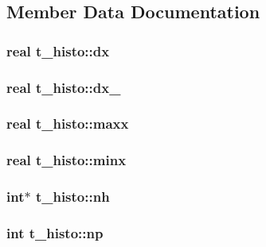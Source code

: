 \subsection{\-Member \-Data \-Documentation}
\hypertarget{structt__histo_a9edd12533230675c2ca282bf39e7ad4f}{
\subsubsection[{dx}]{\setlength{\rightskip}{0pt plus 5cm}real {\bf t\-\_\-histo\-::dx}}}\label{structt__histo_a9edd12533230675c2ca282bf39e7ad4f}
\hypertarget{structt__histo_ae3ce29279673f1d941fd5733d7936ae0}{
\subsubsection[{dx\-\_\-1}]{\setlength{\rightskip}{0pt plus 5cm}real {\bf t\-\_\-histo\-::dx\-\_}}}\label{structt__histo_ae3ce29279673f1d941fd5733d7936ae0}
\hypertarget{structt__histo_a8e6d60a954f1a7c126480e90e39b3ddd}{
\subsubsection[{maxx}]{\setlength{\rightskip}{0pt plus 5cm}real {\bf t\-\_\-histo\-::maxx}}}\label{structt__histo_a8e6d60a954f1a7c126480e90e39b3ddd}
\hypertarget{structt__histo_a169193dcbcd7e2c6149afabc2cb041e2}{
\subsubsection[{minx}]{\setlength{\rightskip}{0pt plus 5cm}real {\bf t\-\_\-histo\-::minx}}}\label{structt__histo_a169193dcbcd7e2c6149afabc2cb041e2}
\hypertarget{structt__histo_a0fe0f858ac238e33a2a346499cd70fa6}{
\subsubsection[{nh}]{\setlength{\rightskip}{0pt plus 5cm}int$\ast$ {\bf t\-\_\-histo\-::nh}}}\label{structt__histo_a0fe0f858ac238e33a2a346499cd70fa6}
\hypertarget{structt__histo_ae1b723e8784af9c058a5fb8db150cca2}{
\subsubsection[{np}]{\setlength{\rightskip}{0pt plus 5cm}int {\bf t\-\_\-histo\-::np}}}\label{structt__histo_ae1b723e8784af9c058a5fb8db150cca2}
